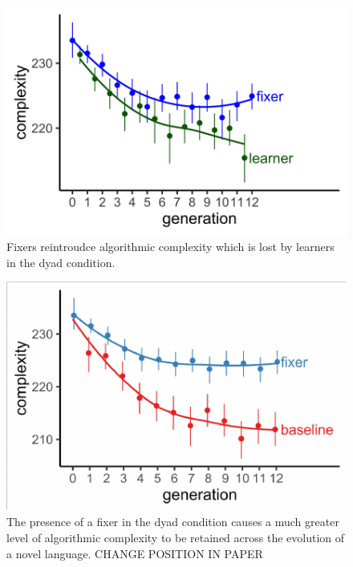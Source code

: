 \documentclass[10pt, letterpaper]{article}
\newenvironment{CodeChunk}{}{}
\begin{document}
\begin{CodeChunk}
\begin{figure}[tb]

{\centering \includegraphics{figs/dyad_complexity-1} 

}

\caption[Fixers reintroudce algorithmic complexity which is lost by learners in the dyad condition]{Fixers reintroudce algorithmic complexity which is lost by learners in the dyad condition.}\label{fig:dyad_complexity}
\end{figure}
\end{CodeChunk}

\begin{CodeChunk}
\begin{figure}[tb]

{\centering \includegraphics{figs/both_complexity-1} 

}

\caption[The presence of a fixer in the dyad condition causes a much greater level of algorithmic complexity to be retained across the evolution of a novel language]{The presence of a fixer in the dyad condition causes a much greater level of algorithmic complexity to be retained across the evolution of a novel language. CHANGE POSITION IN PAPER}\label{fig:both_complexity}
\end{figure}
\end{CodeChunk}
\end{document}

